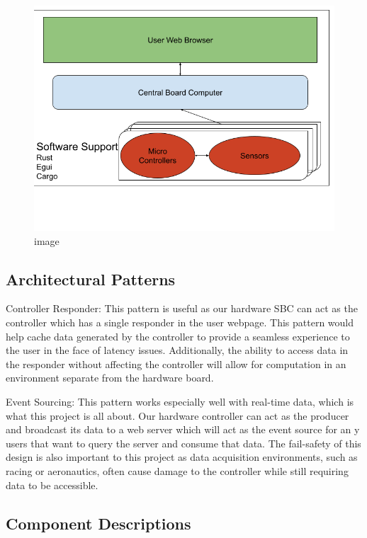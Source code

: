 \begin{figure}
\centering
\includegraphics{SystemOverview.png}
\caption{image}
\end{figure}

\hypertarget{architectural-patterns}{%
\subsection{Architectural Patterns}\label{architectural-patterns}}

Controller Responder: This pattern is useful as our hardware SBC can act
as the controller which has a single responder in the user webpage. This
pattern would help cache data generated by the controller to provide a
seamless experience to the user in the face of latency issues.
Additionally, the ability to access data in the responder without
affecting the controller will allow for computation in an environment
separate from the hardware board.

Event Sourcing: This pattern works especially well with real-time data,
which is what this project is all about. Our hardware controller can act
as the producer and broadcast its data to a web server which will act as
the event source for an y users that want to query the server and
consume that data. The fail-safety of this design is also important to
this project as data acquisition environments, such as racing or
aeronautics, often cause damage to the controller while still requiring
data to be accessible.

\hypertarget{component-descriptions}{%
\subsection{Component Descriptions}\label{component-descriptions}}

